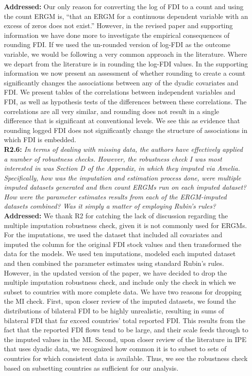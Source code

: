\documentclass[a4paper,11pt]{texMemo}
\begin{document}
\noindent \textbf{Addressed:} Our only reason for converting the log of FDI to a count and using the count ERGM is, ``that an ERGM for a continuous dependent variable with an excess of zeros does not exist.'' However, in the revised paper and supporting information we have done more to investigate the empirical consequences of rounding FDI. If we used the un-rounded version of log-FDI as the outcome variable, we would be following a very common approach in the literature. Where we depart from the literature is in rounding the log-FDI values. In the supporting information we now present an assessment of whether rounding to create a count significantly changes the associations between any of the dyadic covariates and FDI. We present tables of the correlations between independent variables and FDI, as well as hypothesis tests of the differences between these correlations. The correlations are all very similar, and rounding does not result in a single difference that is significant at conventional levels. We see this as evidence that rounding logged FDI does not significantly change the structure of associations in which FDI is embedded. \\

\noindent \textbf{R2.6:} \emph{In terms of dealing with missing data, the authors have effectively applied a number of robustness checks. However, the robustness check I was most interested in was Section D of the Appendix, in which they imputed via Amelia. Specifically, how was the imputation and estimation process done, were multiple imputed datasets generated and then count ERGMs run on each imputed dataset? How were the parameter estimates results from each of the ERGM-imputed datasets combined? Was it simply a matter of employing Rubin's rules?}\\

\noindent \textbf{Addressed:} We thank R2 for catching the lack of discussion regarding the multiple imputation robustness check, given it is not commonly used for ERGMs. For the imputations, we used the dataset that included all covariates and imputed the column for the original FDI stock values and then transformed the data for the models. We used ten imputations, modeled each imputed dataset and then combined the parameter estimates using standard Rubin's rules. However, in the updated version of the paper, we have decided to drop the multiple imputation robustness check, and include only the check in which we subset to countries with more complete data. We have two reasons for dropping the MI check. First, upon closer review of the imputed datasets, we found the distributions of bilateral FDI to be highly unrealistic, resulting in sums of bilateral FDI that far exceed countries' total reported FDI. This results from the fact that the reported FDI flows tend to be large, and their scale feeds through to the imputed values in the MI. Second, upon closer review of the literature in IPE that uses dyadic data, we recognized how common it is to subset to sets of countries for which consistent data is available. Thus, we see the robustness check based on subsetting countries as sufficient for our analysis.\\
\end{document}
